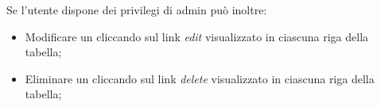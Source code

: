 Se l'utente dispone dei privilegi di admin può inoltre:

\begin{itemize}

	\item Modificare un  cliccando sul link \textit{edit} visualizzato in ciascuna riga della tabella;
	\item Eliminare un  cliccando sul link \textit{delete} visualizzato in ciascuna riga della tabella;

\end{itemize}

